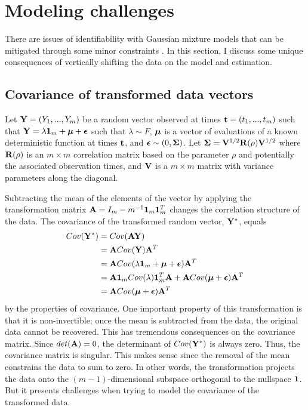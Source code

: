 \section{Modeling challenges}
There are issues of identifiability with Gaussian mixture models that can be mitigated through some minor constraints \cite{mclachlan2000}. In this section, I discuss some unique consequences of vertically shifting the data on the model and estimation.

\subsection{Covariance of transformed data vectors}
Let $\mathbf Y=(Y_{1},...,Y_{m})$ be a random vector observed at times $\mathbf t=(t_{1},...,t_{m})$ such that
$\mathbf Y = \lambda\mathbf 1_{m} + \boldsymbol\mu + \boldsymbol\epsilon$
such that $\lambda\sim F$, $\boldsymbol\mu$ is a vector of evaluations of a known deterministic function at times $\mathbf t$, and $\boldsymbol\epsilon\sim(0,\boldsymbol\Sigma)$. Let $\mathbf\Sigma =\mathbf V^{1/2}\mathbf R(\rho)\mathbf V^{1/2}$ where $\mathbf R(\rho)$ is an $m\times m$ correlation matrix based on the parameter $\rho$ and potentially the associated observation times, and $\mathbf V$ is a $m\times m$ matrix with variance parameters along the diagonal. 

Subtracting the mean of the elements of the vector by applying the transformation matrix $\mathbf A = I_{m}-m^{-1}\mathbf 1_{m}\mathbf 1_{m}^{T}$ changes the correlation structure of the data. The covariance of the transformed random vector, $\mathbf Y^{*}$, equals
\begin{align*}
Cov(\mathbf Y^{*})&=Cov(\mathbf A\mathbf Y)\\
 &= \mathbf ACov(\mathbf Y)\mathbf A^{T}\\
&= \mathbf ACov(\lambda\mathbf 1_{m} + \boldsymbol\mu + \boldsymbol\epsilon)\mathbf A^{T}\\
&=  \mathbf A\mathbf 1_{m}Cov(\lambda)\mathbf 1^{T}_{m}\mathbf A +\mathbf ACov( \boldsymbol\mu + \boldsymbol\epsilon)\mathbf A^{T}\\
&= \mathbf ACov( \boldsymbol\mu + \boldsymbol\epsilon)\mathbf A^{T}
\end{align*}
by the properties of covariance. One important property of this transformation is that it is non-invertible; once the mean is subtracted from the data, the original data cannot be recovered. This has tremendous consequences on the covariance matrix. Since $det(\mathbf A) = 0$, the determinant of $Cov(\mathbf Y^{*})$ is always zero. Thus, the covariance matrix is singular. This makes sense since the removal of the mean constrains the data to sum to zero. In other words, the transformation projects the data onto the $(m-1)$-dimensional subspace orthogonal to the nullspace $\mathbf 1$. But it presents challenges when trying to model the covariance of the transformed data. 

